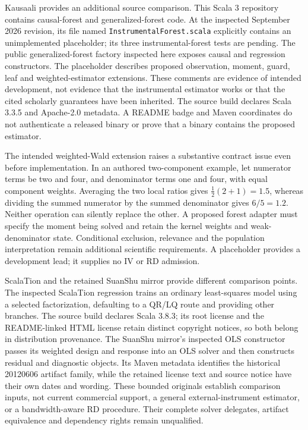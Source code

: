 Kausaali provides an additional source comparison. This Scala 3 repository contains causal-forest and generalized-forest code. At the inspected September 2026 revision, its file named \texttt{InstrumentalForest.scala} explicitly contains an unimplemented placeholder; its three instrumental-forest tests are pending. The public generalized-forest factory inspected here exposes causal and regression constructors. The placeholder describes proposed observation, moment, guard, leaf and weighted-estimator extensions. These comments are evidence of intended development, not evidence that the instrumental estimator works or that the cited scholarly guarantees have been inherited. The source build declares Scala 3.3.5 and Apache-2.0 metadata. A README badge and Maven coordinates do not authenticate a released binary or prove that a binary contains the proposed estimator.~\citep{exec25_javaiv_kausaali}

The intended weighted-Wald extension raises a substantive contract issue even before implementation. In an authored two-component example, let numerator terms be two and four, and denominator terms one and four, with equal component weights. Averaging the two local ratios gives $\tfrac12(2+1)=1.5$, whereas dividing the summed numerator by the summed denominator gives $6/5=1.2$. Neither operation can silently replace the other. A proposed forest adapter must specify the moment being solved and retain the kernel weights and weak-denominator state. Conditional exclusion, relevance and the population interpretation remain additional scientific requirements. A placeholder provides a development lead; it supplies no IV or RD admission.~\citep{exec25_javaiv_kausaali,exec25_javaiv_choice}

ScalaTion and the retained SuanShu mirror provide different comparison points. The inspected ScalaTion regression trains an ordinary least-squares model using a selected factorization, defaulting to a QR/LQ route and providing other branches. The source build declares Scala 3.8.3; its root license and the README-linked HTML license retain distinct copyright notices, so both belong in distribution provenance. The SuanShu mirror's inspected OLS constructor passes its weighted design and response into an OLS solver and then constructs residual and diagnostic objects. Its Maven metadata identifies the historical 20120606 artifact family, while the retained license text and source notice have their own dates and wording. These bounded originals establish comparison inputs, not current commercial support, a general external-instrument estimator, or a bandwidth-aware RD procedure. Their complete solver delegates, artifact equivalence and dependency rights remain unqualified.~\citep{exec25_javaiv_scalation,exec25_javaiv_suan}

